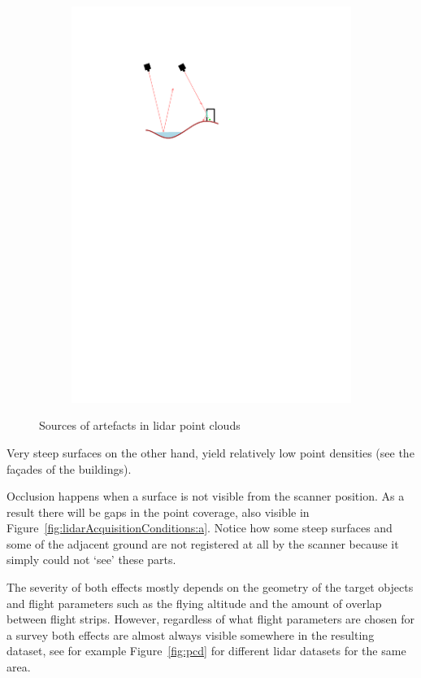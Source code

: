 \begin{figure}
\begin{subfigure}{0.3\linewidth}
		\includegraphics[width=\textwidth,page=1]{figs/lidarAcq.pdf}
		\label{fig:lidarAcquisitionConditions:b}
	\end{subfigure}
	\caption{Sources of artefacts in lidar point clouds}%
\label{fig:lidarAcquisitionConditions}
\end{figure}
Very steep surfaces on the other hand, yield relatively low point densities (see the façades of the buildings). 

Occlusion happens when a surface is not visible from the scanner position. 
As a result there will be gaps in the point coverage, also visible in Figure~\ref{fig:lidarAcquisitionConditions:a}. 
Notice how some steep surfaces and some of the adjacent ground are not registered at all by the scanner because it simply could not `see' these parts.

The severity of both effects mostly depends on the geometry of the target objects and flight parameters such as the flying altitude and the amount of overlap between flight strips.
However, regardless of what flight parameters are chosen for a survey both effects are almost always visible somewhere in the resulting dataset, see for example Figure~\ref{fig:pcd} for different lidar datasets for the same area.

